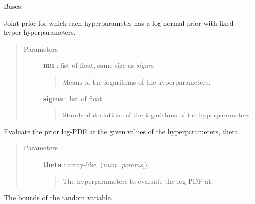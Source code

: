 \documentclass[letterpaper,10pt,english]{sphinxmanual}
\begin{document}
\begin{fulllineitems}
\label{gptools:gptools.utils.LogNormalJointPrior}
Bases: {\hyperref[gptools:gptools.utils.JointPrior]{}}

Joint prior for which each hyperparameter has a log-normal prior with fixed hyper-hyperparameters.
\begin{quote}\begin{description}
\item[{Parameters}] \leavevmode
\textbf{mu} : list of float, same size as \emph{sigma}
\begin{quote}

Means of the logarithms of the hyperparameters.
\end{quote}

\textbf{sigma} : list of float
\begin{quote}

Standard deviations of the logarithms of the hyperparameters.
\end{quote}

\end{description}\end{quote}

\begin{fulllineitems}
\label{gptools:gptools.utils.LogNormalJointPrior.__call__}
Evaluate the prior log-PDF at the given values of the hyperparameters, theta.
\begin{quote}\begin{description}
\item[{Parameters}] \leavevmode
\textbf{theta} : array-like, (\emph{num\_params},)
\begin{quote}

The hyperparameters to evaluate the log-PDF at.
\end{quote}

\end{description}\end{quote}

\end{fulllineitems}


\begin{fulllineitems}
\label{gptools:gptools.utils.LogNormalJointPrior.bounds}
The bounds of the random variable.


\end{fulllineitems}
\end{fulllineitems}
\end{document}
